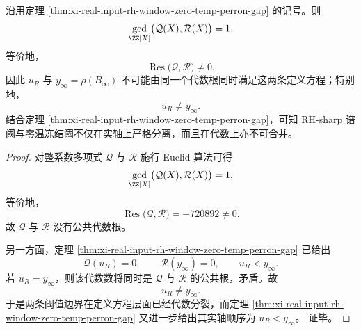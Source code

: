 \begin{theorem}\label{thm:xi-real-input-rh-threshold-zero-temp-algebraic-splitting}
沿用定理 \ref{thm:xi-real-input-rh-window-zero-temp-perron-gap} 的记号。则
\[
\gcd_{\ZZ[X]}\bigl(\mathcal Q(X),\mathcal R(X)\bigr)=1.
\]
等价地，
\[
\operatorname{Res}\bigl(\mathcal Q,\mathcal R\bigr)\neq 0.
\]
因此 \(u_R\) 与 \(y_\infty=\rho(B_\infty)\) 不可能由同一个代数根同时满足这两条定义方程；特别地，
\[
u_R\neq y_\infty.
\]
结合定理 \ref{thm:xi-real-input-rh-window-zero-temp-perron-gap}，可知 RH-sharp 谱阈与零温冻结阈不仅在实轴上严格分离，而且在代数上亦不可合并。
\end{theorem}
\begin{proof}
对整系数多项式 \(\mathcal Q\) 与 \(\mathcal R\) 施行 Euclid 算法可得
\[
\gcd_{\ZZ[X]}\bigl(\mathcal Q(X),\mathcal R(X)\bigr)=1,
\]
等价地，
\[
\operatorname{Res}\bigl(\mathcal Q,\mathcal R\bigr)=-720892\neq 0.
\]
故 \(\mathcal Q\) 与 \(\mathcal R\) 没有公共代数根。

另一方面，定理 \ref{thm:xi-real-input-rh-window-zero-temp-perron-gap} 已给出
\[
\mathcal Q(u_R)=0,
\qquad
\mathcal R(y_\infty)=0,
\qquad
u_R<y_\infty.
\]
若 \(u_R=y_\infty\)，则该代数数将同时是 \(\mathcal Q\) 与 \(\mathcal R\) 的公共根，矛盾。故
\[
u_R\neq y_\infty.
\]
于是两条阈值边界在定义方程层面已经代数分裂，而定理 \ref{thm:xi-real-input-rh-window-zero-temp-perron-gap} 又进一步给出其实轴顺序为
\(
u_R<y_\infty
\)。
证毕。
\end{proof}

\endinput


